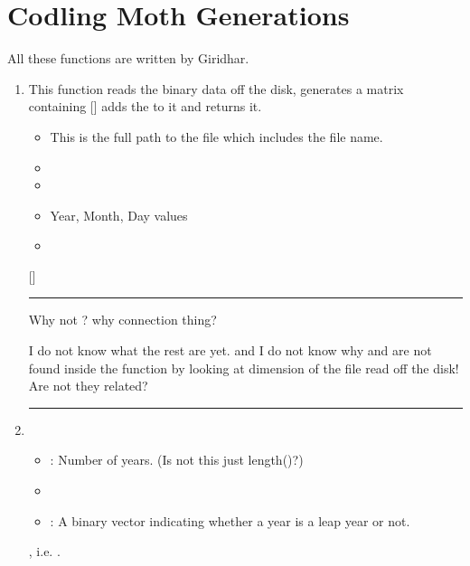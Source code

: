 
\section{Codling Moth Generations}

All these functions are written by Giridhar.

\begin{enumerate}

\item {}
This function reads the binary data off the disk, 
generates a matrix containing [] 
adds the  to it and returns it.

\begin{itemize}
\item {} This is the full path to the file which includes the file name.
\item {}
\item {}
\item {} Year, Month, Day values
\item {}
\end{itemize}

 []

\hrule

Why not ? why connection thing?

I do not know what the rest are yet. and I do not 
know why  and {}
are not found inside the function by looking at dimension of 
the file read off the disk! Are not they related?

\hrule


\pagebreak

\item {}

\begin{itemize}
\item {}: Number of years. (Is not this just length()?)
\item {}
\item {}: A binary vector indicating whether a year is a leap year or not.
\end{itemize}
 , i.e. .


\end{enumerate}
